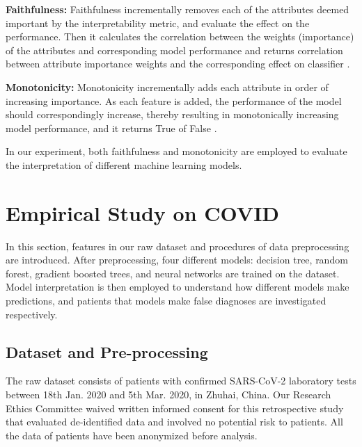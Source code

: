 
\textbf{Faithfulness:} Faithfulness incrementally removes each of the attributes deemed important by the interpretability metric, and evaluate the effect on the performance. Then it calculates the correlation between the weights (importance) of the attributes and corresponding model performance and returns correlation between attribute importance weights and the corresponding effect on classifier \citep{alvarezmelis2018robust}.

\textbf{Monotonicity:} Monotonicity incrementally adds each attribute in order of increasing importance. As each feature is added, the performance of the model should correspondingly increase, thereby resulting in monotonically increasing model performance, and it returns True of False \citep{luss2019generating}.
\color{black}

In our experiment, both faithfulness and monotonicity are employed to evaluate the interpretation of different machine learning models. 

\section{Empirical Study on COVID}

In this section, features in our raw dataset and procedures of data preprocessing are introduced. After preprocessing, four different models: decision tree, random forest, gradient boosted trees, and neural networks are trained on the dataset. Model interpretation is then employed to understand how different models make predictions, and patients that models make false diagnoses are investigated respectively.

\subsection{Dataset and Pre-processing}

The raw dataset consists of patients with confirmed SARS-CoV-2 laboratory tests between 18th Jan. 2020 and 5th Mar. 2020, in Zhuhai, China. Our Research Ethics Committee waived written informed consent for this retrospective study that evaluated de-identified data and involved no potential risk to patients. All the data of patients have been anonymized before analysis.

